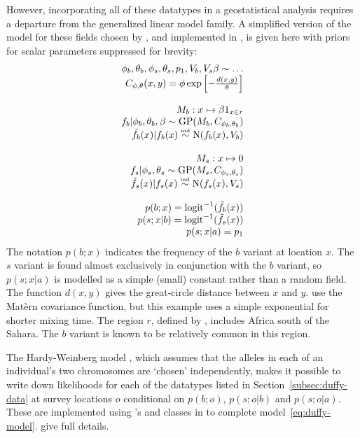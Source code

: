 \documentclass[article]{jss}
\begin{document}
However, incorporating all of these datatypes in a geostatistical analysis requires a departure from the generalized linear model family. A simplified version of the model for these fields chosen by \cite{Howes}, and implemented in , is given here with priors for scalar parameters suppressed for brevity:
\begin{equation}
    \label{eq:duffy-model} 
    \begin{array}{r}
        \phi_b,\theta_b,\phi_s,\theta_s,p_1,V_b,V_s\beta\sim\ldots\\
        C_{\phi,\theta}(x,y)=\phi\exp\left[{-\frac{d(x,y)}{\theta}}\right]\\\\
        M_b : x\mapsto \beta1_{x\in r}\\
        f_b|\phi_b,\theta_b,\beta\sim \textup{GP}(M_b, C_{\phi_b,\theta_b}) \\
        \tilde f_b(x) | f_b(x) \stackrel{\textup{\tiny ind}}{\sim} \textup{N}(f_b(x),V_b) \\\\
        M_s : x\mapsto 0\\
        f_s|\phi_s,\theta_s\sim \textup{GP}(M_s, C_{\phi_s,\theta_s})\\
        \tilde f_s(x) | f_s(x) \stackrel{\textup{\tiny ind}}{\sim} \textup{N}(f_s(x),V_s)\\\\
        p(b;x) = \textup{logit}^{-1}(\tilde f_b(x))\\
        p(s;x|b)= \textup{logit}^{-1}(\tilde f_s(x))\\
        p(s;x|a)= p_1
    \end{array}
\end{equation}  
The notation $p(b;x)$ indicates the frequency of the $b$ variant at location $x$. The $s$ variant is found almost exclusively in conjunction with the $b$ variant, so $p(s;x|a)$ is modelled as a simple (small) constant rather than a random field. The function $d(x,y)$ gives the great-circle distance between $x$ and $y$. \cite{Howes} use the Mat\`ern covariance function, but this example uses a simple exponential for shorter mixing time. The region $r$, defined by \cite{Howes}, includes Africa south of the Sahara. The $b$ variant is known to be relatively common in this region. 

The Hardy-Weinberg model \citep{gillespie}, which assumes that the alleles in each of an individual's two chromosomes are `chosen' independently, makes it possible to write down likelihoods for each of the datatypes listed in Section~\ref{subsec:duffy-data} at survey locations $o$ conditional on $p(b;o)$, $p(s;o|b)$ and $p(s;o|a)$. These are implemented using 's  and  classes in  to complete model~\ref{eq:duffy-model}. \cite{Howes} give full details.
\end{document}
